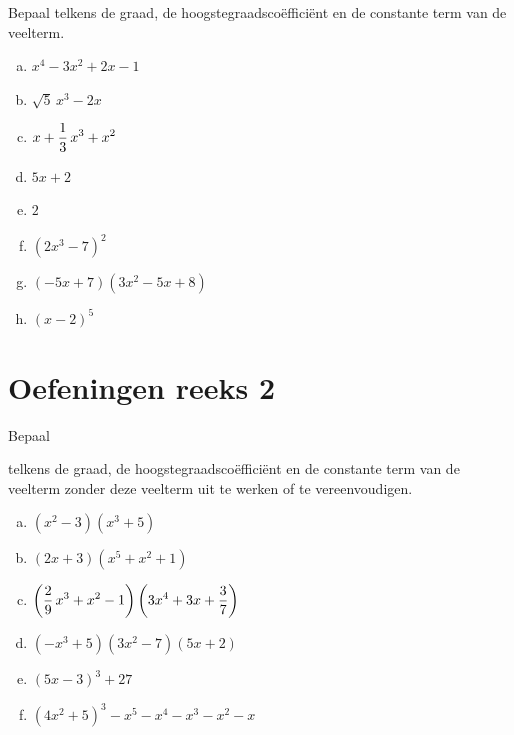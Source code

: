 \documentclass{ximera}
\begin{document}
\begin{exercise} 
Bepaal telkens de graad, de hoogstegraadsco\"effici\"ent en de constante term van de veelterm.
\begin{multicols}{2}
\begin{enumerate}[(a)]
\item
$x^4-3x^2+2x-1$
\item
$\sqrt{5}\,x^3-2x$
\item
$\displaystyle x+\frac{1}{3}\,x^3+x^2$
\item
$5x+2$
\item
$2$
\item
$(2x^3-7)^2$
\item
$(-5x+7)(3x^2-5x+8)$
\item
$(x-2)^5$
\end{enumerate}
\end{multicols}
\end{exercise} 

\section*{Oefeningen reeks 2}

\begin{exercise} 
\hypertarget{oef1.5}{Bepaal} telkens de graad, de hoogstegraadsco\"effici\"ent en de constante term van de veelterm zonder deze veelterm uit te werken of te vereenvoudigen. 
\begin{multicols}{2}
\begin{enumerate}[(a)]
\item
$(x^2-3)(x^3+5)$
\item
$(2x+3)(x^5+x^2+1)$
\item
$\displaystyle \left(\frac{2}{9}\,x^3+x^2-1\right)\left(3x^4+3x+\frac{3}{7}\right)$
\item
$(-x^3+5)(3x^2-7)(5x+2)$
\item
$(5x-3)^3+27$
\item
$(4x^2+5)^3-x^5-x^4-x^3-x^2-x$
\end{enumerate}
\end{multicols}
\end{exercise} 

\pagebreak
\end{document}
